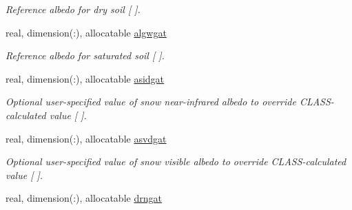 \begin{DoxyCompactItemize}
\begin{DoxyCompactList}\small\item\em Reference albedo for dry soil \mbox{[} \mbox{]}. \end{DoxyCompactList}\item 
\hypertarget{structclass__statevars_1_1class__gather_af8869de17265b7272148ba369a172ede}{}real, dimension(\+:), allocatable \hyperlink{structclass__statevars_1_1class__gather_af8869de17265b7272148ba369a172ede}{algwgat}\label{structclass__statevars_1_1class__gather_af8869de17265b7272148ba369a172ede}

\begin{DoxyCompactList}\small\item\em Reference albedo for saturated soil \mbox{[} \mbox{]}. \end{DoxyCompactList}\item 
\hypertarget{structclass__statevars_1_1class__gather_a7c067d0c4bcd12e1821c92ac3024ceb5}{}real, dimension(\+:), allocatable \hyperlink{structclass__statevars_1_1class__gather_a7c067d0c4bcd12e1821c92ac3024ceb5}{asidgat}\label{structclass__statevars_1_1class__gather_a7c067d0c4bcd12e1821c92ac3024ceb5}

\begin{DoxyCompactList}\small\item\em Optional user-\/specified value of snow near-\/infrared albedo to override C\+L\+A\+S\+S-\/calculated value \mbox{[} \mbox{]}. \end{DoxyCompactList}\item 
\hypertarget{structclass__statevars_1_1class__gather_aa29fa806f7494d7c30c39d13cd1f7f72}{}real, dimension(\+:), allocatable \hyperlink{structclass__statevars_1_1class__gather_aa29fa806f7494d7c30c39d13cd1f7f72}{asvdgat}\label{structclass__statevars_1_1class__gather_aa29fa806f7494d7c30c39d13cd1f7f72}

\begin{DoxyCompactList}\small\item\em Optional user-\/specified value of snow visible albedo to override C\+L\+A\+S\+S-\/calculated value \mbox{[} \mbox{]}. \end{DoxyCompactList}\item 
\hypertarget{structclass__statevars_1_1class__gather_a3b88842464fdf086cfffd23d10065949}{}real, dimension(\+:), allocatable \hyperlink{structclass__statevars_1_1class__gather_a3b88842464fdf086cfffd23d10065949}{drngat}\label{structclass__statevars_1_1class__gather_a3b88842464fdf086cfffd23d10065949}


\end{DoxyCompactItemize}
